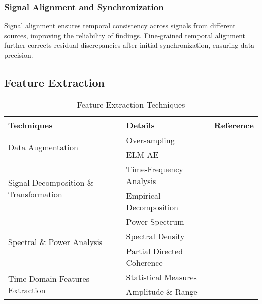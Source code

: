 \subsubsection{Signal Alignment and Synchronization}
Signal alignment ensures temporal consistency across signals from different sources, improving the reliability of findings. Fine-grained temporal alignment further corrects residual discrepancies after initial synchronization, ensuring data precision.



\subsection{Feature Extraction}

\begin{table}[t]
\renewcommand{\arraystretch}{1.2}
\caption{Feature Extraction Techniques}
\label{tab:highlevel}
\footnotesize
\centering
\begin{tabular}{p{80pt}p{90pt}p{30pt}} %
\hline
\textbf{Techniques}     & \textbf{Details}                 & \textbf{Reference}             \\
\hline
\multirow{2}{80pt}{Data Augmentation} & Oversampling                     & ~\cite{ZHANG2020105089}         \\
                                       & ELM-AE                           & ~\cite{9713847}                 \\
\hline
\multirow{2}{80pt}{Signal Decomposition \& Transformation} 
                                       & Time-Frequency Analysis          & ~\cite{PD2} \\
                                       & Empirical Decomposition          & ~\cite{zulfikar2022empirical}   \\
\hline
\multirow{3}{80pt}{Spectral \& Power Analysis}  
                                       & Power Spectrum                   & ~\cite{li2019eeg}               \\
                                       & Spectral Density                 & ~\cite{Seizure214}        \\
                                       & Partial Directed Coherence       & ~\cite{khan2021automated}       \\
\hline
\multirow{3}{80pt}{Time-Domain Features Extraction}  
                                       & Statistical Measures             & ~\cite{zhu2019multimodal}       \\
                                       & Amplitude \& Range               & ~\cite{Seizure7}    \\

\end{tabular}
\end{table}
